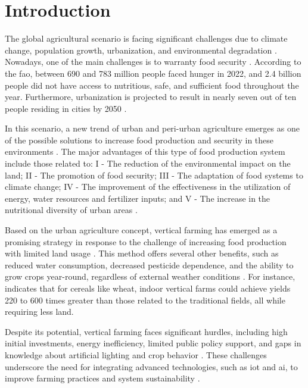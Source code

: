 \documentclass[preprint, review, 12pt]{elsarticle}
\begin{document}

\section{Introduction}
\label{sec:intro}

The global agricultural scenario is facing significant challenges due to climate change, population growth, urbanization, and environmental degradation \cite{FAO2022a}. Nowadays, one of the main challenges is to warranty food security \cite{FAO2023a}. According to the \gls{fao}, between 690 and 783 million people faced hunger in 2022, and 2.4 billion people did not have access to nutritious, safe, and sufficient food throughout the year. Furthermore, urbanization is projected to result in nearly seven out of ten people residing in cities by 2050 \cite{FAO2023a}. 

In this scenario, a new trend of urban and peri-urban agriculture emerges as one of the possible solutions to increase food production and security in these environments \cite{weidner2019a}. The major advantages of this type of food production system include those related to: I - The reduction of the environmental impact on the land; II - The promotion of food security; III - The adaptation of food systems to climate change; IV - The improvement of the effectiveness in the utilization of energy, water resources and fertilizer inputs; and V - The increase in the nutritional diversity of urban areas \cite{FAO2022b}.

Based on the urban agriculture concept, vertical farming has emerged as a promising strategy in response to the challenge of increasing food production with limited land usage \cite{vatistas2022, eigenbrod2015}. This method offers several other benefits, such as reduced water consumption, decreased pesticide dependence, and the ability to grow crops year-round, regardless of external weather conditions \cite{vandelden2021}. For instance, \cite{asseng2020} indicates that for cereals like wheat, indoor vertical farms could achieve yields 220 to 600 times greater than those related to the traditional fields, all while requiring less land.

Despite its potential, vertical farming faces significant hurdles, including high initial investments, energy inefficiency, limited public policy support, and gaps in knowledge about artificial lighting and crop behavior \cite{vandelden2021, lubna2022}. These challenges underscore the need for integrating advanced technologies, such as \gls{iot} and \gls{ai}, to improve farming practices and system sustainability \cite{dhanaraju2022, elbasi2023}.
\end{document}
